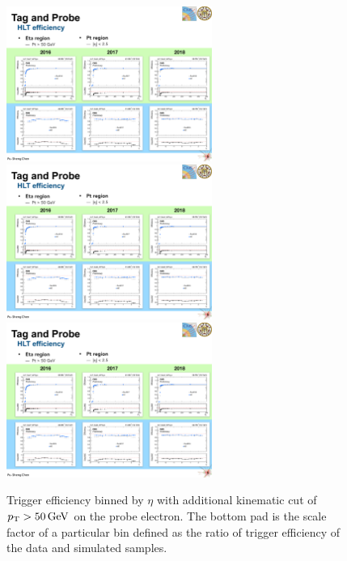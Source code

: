 \begin{figure}\centering
    \includegraphics[width=0.6\textwidth]{figure/appendix_16eta.pdf}
    \includegraphics[width=0.6\textwidth]{figure/appendix_17eta.pdf}
    \includegraphics[width=0.6\textwidth]{figure/appendix_18eta.pdf}
    \caption[Trigger efficiency binned by $\eta$]
    {
        Trigger efficiency binned by $\eta$ with additional kinematic cut of $p_{\mathrm{T}}>50\,\text{Ge\hspace{-.08em}V}$ on the probe electron.
        The bottom pad is the scale factor of a particular bin defined as the ratio of trigger efficiency of the data and simulated samples.
    }
    \label{fig:appendix_etaeff}
\end{figure}

